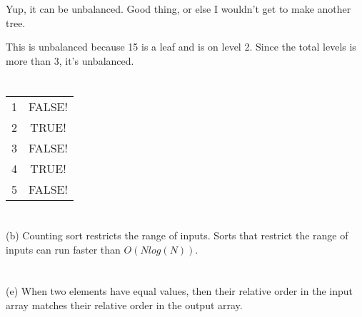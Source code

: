 \documentclass[tikz, a4paper,12pt]{article}
\begin{document}
\section{}
Yup, it can be unbalanced.
Good thing, or else I wouldn't get to make another tree.


This is unbalanced because 15 is a leaf and is on level 2.
Since the total levels is more than 3, it's unbalanced.

\section{}
\begin{tabular}{ l | c }
  1 & FALSE!  \\
  2 & TRUE!   \\
  3 & FALSE!  \\
  4 & TRUE!   \\
  5 & FALSE!  \\
\end{tabular}

\section{}
(b) Counting sort restricts the range of inputs. Sorts that restrict the range of inputs can run faster than $O(Nlog(N))$.

\section{}
(e) When two elements have equal values, then their relative order in the input array matches their relative order in the output array.
\end{document}
